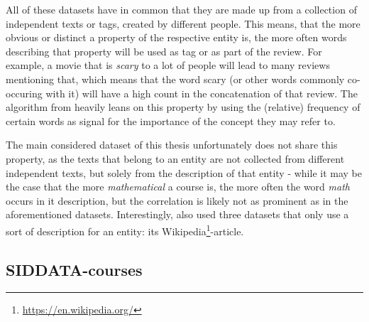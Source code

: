 All of these datasets have in common that they are made up from a collection of independent texts or tags, created by different people. This means, that the more obvious or distinct a property of the respective entity is, the more often words describing that property will be used as tag or as part of the review. For example, a movie that is \emph{scary} to a lot of people will lead to many reviews mentioning that, which means that the word scary (or other words commonly co-occuring with it) will have a high count in the concatenation of that review. The algorithm from \cite{Derrac2015} heavily leans on this property by using the (relative) frequency of certain words as signal for the importance of the concept they may refer to. 

The main considered dataset of this thesis unfortunately does not share this property, as the texts that belong to an entity are not collected from different independent texts, but solely from the description of that entity - while it may be the case that the more \emph{mathematical} a course is, the more often the word \emph{math} occurs in it description, but the correlation is likely not as prominent as in the aforementioned datasets. Interestingly, \cite{Alshaikh2020} also used three datasets that only use a sort of description for an entity: its Wikipedia\footnote{\url{https://en.wikipedia.org/}}-article.





\subsection{SIDDATA-courses}

\label{sec:dataset_siddata}


